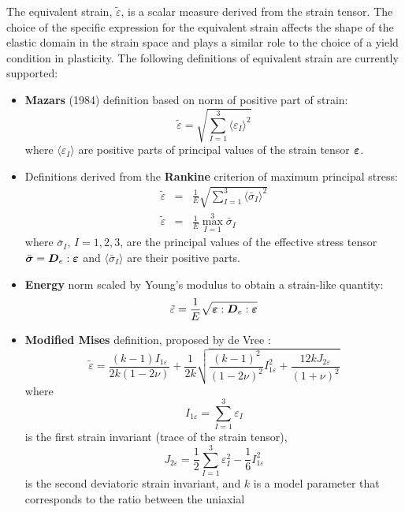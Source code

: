 \documentclass[a4paper]{article}
\newcommand{\mbf}[1]{\mbox{\boldmath$#1$}}
\newcommand{\del}[2]{\mbox{$\displaystyle\frac{#1}{#2}$}}
\begin{document}
The equivalent strain, $\tilde\varepsilon$, is a scalar measure derived from the
strain tensor. The choice of the specific expression
for the equivalent strain affects the shape of the elastic domain
in the strain space and plays a similar role to the choice of a yield
condition in plasticity.
The following definitions of equivalent strain are currently supported:
\begin{itemize}
\item {\bf Mazars} (1984) definition based on norm of positive part of strain:
\begin{equation}
\label{mazars}
\tilde\varepsilon=\sqrt{\displaystyle{\sum_{I=1}^{3}}\langle\varepsilon_I\rangle^2}
\end{equation}
where $\langle\varepsilon_I\rangle$ are positive parts of 
principal values of the strain tensor $\mbf{\varepsilon}$.
\item Definitions derived from the {\bf Rankine} criterion of maximum principal stress:
\begin{eqnarray}
\label{rankinesmooth}
\tilde\varepsilon&=&
{\del{1}{E}}\sqrt{\displaystyle{\sum_{I=1}^{3}}\langle\bar{\sigma}_I\rangle^2}
\\
\label{rankinestandard}
\tilde\varepsilon&=&
{\del{1}{E}}\max_{I=1}^{3}\bar{\sigma}_I
\end{eqnarray}
where
$\bar{\sigma}_I$, $I=1,2,3$, are the principal 
values of the
effective stress tensor $\bar{\mbf{\sigma}} = \mbf{D}_e:\mbf{\varepsilon}$
and $\langle\bar{\sigma}_I\rangle$ are their positive parts.
\item {\bf Energy} norm scaled by Young's modulus to obtain
a strain-like quantity:
\begin{equation}
\label{energynorm}
\tilde\varepsilon=\del{1}{E}\sqrt{{\mbf{\varepsilon}:\mbf{D}_e:\mbf{\varepsilon}}}
\end{equation}
\item {\bf Modified Mises} definition, proposed by de Vree \cite{Vree:95}:
\begin{equation}
\label{modifiedmises}
\tilde\varepsilon=\frac{(k-1)I_{1\varepsilon}}{2k(1-2\nu)} + \frac{1}{2k}\sqrt{\frac{(k-1)^2}{(1-2\nu)^2}I_{1\varepsilon}^2+\frac{12 k J_{2\varepsilon}}{(1+\nu)^2}} 
\end{equation}
where $$
I_{1\varepsilon} = \sum_{I=1}^3\varepsilon_I
$$
is the first strain invariant (trace of the strain tensor),
$$
J_{2\varepsilon} = \frac{1}{2}\sum_{I=1}^3 \varepsilon_I^2-\frac{1}{6}I_{1\varepsilon}^2
$$  
is the second deviatoric strain invariant,
and $k$ is a model parameter that corresponds to the ratio between the uniaxial

\end{itemize}
\end{document}
